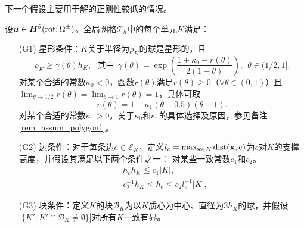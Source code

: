 下一个假设主要用于解的正则性较低的情况。
\begin{assumption}
\label{assump_polygon}
设$\boldsymbol{u}\in \boldsymbol{H}^{\theta}(\mathrm{rot};\Omega^{\pm})$。全局网格$\mathcal{T}_h$中的每个单元$K$满足：
\begin{itemize}
\item[(G1)] \label{asp:polygonG1} 星形条件：$K$关于半径为$\rho_K$的球是星形的，且
\begin{equation}
\label{rho_cont}
\rho_K \ge \gamma(\theta) h_K, ~~~ \text{其中} ~~ \gamma(\theta) = \exp\left(
\frac{ 1 + \kappa_0 - r(\theta) }{2(1-\theta)} \right), ~~ \theta\in(1/2,1].
\end{equation}
对某个合适的常数$\kappa_0<0$，函数$r(\theta)$满足$r(\theta)\ge 0$（$\forall \theta \in(0,1)$）且$\lim_{\theta\rightarrow 1/2}r(\theta) = \lim_{\theta\rightarrow1}r(\theta) = 1$，具体可取
\begin{equation}
\label{rho_cont_1}
r(\theta) = 1 - \kappa_1 (\theta-0.5)(\theta-1).
\end{equation}
对某个合适的常数$\kappa_1>0$。关于$\kappa_0$和$\kappa_1$的具体选择及原因，参见备注\ref{rem_assum_polygon1}。

\item[(G2)] \label{asp:polygonG2} 边条件：对于每条边$e\in \mathcal{E}_K$，定义$l_e = \max_{\mathbf{x} \in K}\mathrm{dist}(\mathbf{x},e)$为$e$对$K$的支撑高度，并假设其满足以下两个条件之一：
对某些一致常数$c_1$和$c_2$。
\begin{subequations}
\label{edge_cond}
\begin{align}
& h_eh_K \le c_1 |K|,  \label{edge_cond_eq1}  \\
&  c^{-1}_2 h_K \le  h_e  \le c_2 l^{-1}_e |K|, \label{edge_cond_eq2}
\end{align}
\end{subequations}

\item[(G3)] \label{asp:polygonG3} 块条件：定义$K$的块$\mathcal{B}_K$为以$K$质心为中心、直径为$3h_K$的球，并假设$|\{ K': K'\cap \mathcal{B}_K\neq\emptyset  \}|$对所有$K$一致有界。
\end{itemize}
\end{assumption}

